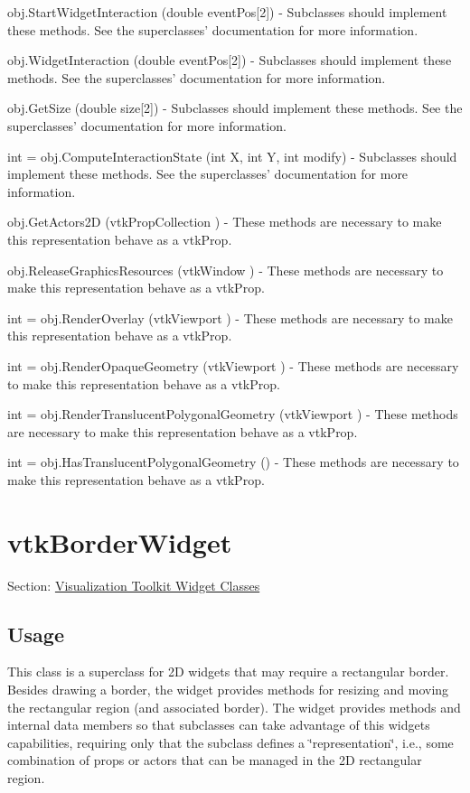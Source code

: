\begin{DoxyItemize}
\item {\ttfamily obj.\-Start\-Widget\-Interaction (double event\-Pos\mbox{[}2\mbox{]})} -\/ Subclasses should implement these methods. See the superclasses' documentation for more information.  
\item {\ttfamily obj.\-Widget\-Interaction (double event\-Pos\mbox{[}2\mbox{]})} -\/ Subclasses should implement these methods. See the superclasses' documentation for more information.  
\item {\ttfamily obj.\-Get\-Size (double size\mbox{[}2\mbox{]})} -\/ Subclasses should implement these methods. See the superclasses' documentation for more information.  
\item {\ttfamily int = obj.\-Compute\-Interaction\-State (int X, int Y, int modify)} -\/ Subclasses should implement these methods. See the superclasses' documentation for more information.  
\item {\ttfamily obj.\-Get\-Actors2\-D (vtk\-Prop\-Collection )} -\/ These methods are necessary to make this representation behave as a vtk\-Prop.  
\item {\ttfamily obj.\-Release\-Graphics\-Resources (vtk\-Window )} -\/ These methods are necessary to make this representation behave as a vtk\-Prop.  
\item {\ttfamily int = obj.\-Render\-Overlay (vtk\-Viewport )} -\/ These methods are necessary to make this representation behave as a vtk\-Prop.  
\item {\ttfamily int = obj.\-Render\-Opaque\-Geometry (vtk\-Viewport )} -\/ These methods are necessary to make this representation behave as a vtk\-Prop.  
\item {\ttfamily int = obj.\-Render\-Translucent\-Polygonal\-Geometry (vtk\-Viewport )} -\/ These methods are necessary to make this representation behave as a vtk\-Prop.  
\item {\ttfamily int = obj.\-Has\-Translucent\-Polygonal\-Geometry ()} -\/ These methods are necessary to make this representation behave as a vtk\-Prop.  
\end{DoxyItemize}\hypertarget{vtkwidgets_vtkborderwidget}{}\section{vtk\-Border\-Widget}\label{vtkwidgets_vtkborderwidget}
Section\-: \hyperlink{sec_vtkwidgets}{Visualization Toolkit Widget Classes} \hypertarget{vtkwidgets_vtkxyplotwidget_Usage}{}\subsection{Usage}\label{vtkwidgets_vtkxyplotwidget_Usage}
This class is a superclass for 2\-D widgets that may require a rectangular border. Besides drawing a border, the widget provides methods for resizing and moving the rectangular region (and associated border). The widget provides methods and internal data members so that subclasses can take advantage of this widgets capabilities, requiring only that the subclass defines a \char`\"{}representation\char`\"{}, i.\-e., some combination of props or actors that can be managed in the 2\-D rectangular region.

